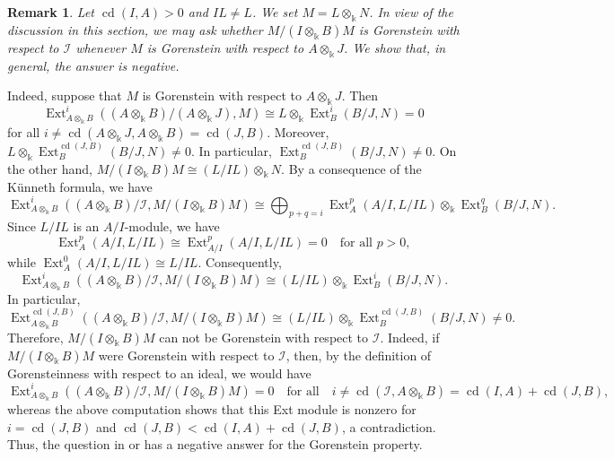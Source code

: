 \documentclass[10pt,a4paper]{amsart}
\numberwithin{equation}{theorem}
\theoremstyle{definition}
\theoremstyle{fact}
\newtheorem{remark}[theorem]{Remark}
\theoremstyle{conjecture}
\newcommand{\cd}{\operatorname{cd}}
\newcommand{\Ext}{\operatorname{Ext}}
\begin{document}
\vspace{.2cm}
\vspace{.3cm}

\begin{remark}{\em
\label{6.10}
Let $\cd(I, A)>0$ and $IL\neq L$.  We set $M=L\otimes_{\Bbbk}N$. In view of the discussion in this section, we may ask whether
$
M/(I\otimes_{\Bbbk}B)M
$
is Gorenstein with respect to $\mathcal{I}$ whenever $M$ is Gorenstein with respect to
$A\otimes_{\Bbbk}J$. We show that, in general, the answer is negative.

Indeed, suppose that $M$ is Gorenstein with respect to
$A\otimes_{\Bbbk}J$. Then
\[
\Ext^i_{A\otimes_{\Bbbk}B}
\left(
(A\otimes_{\Bbbk}B)/(A\otimes_{\Bbbk}J),
M
\right)\cong
L\otimes_{\Bbbk}\Ext^i_B(B/J,N)=0
\]
for all $i\neq\cd(A\otimes_{\Bbbk}J, A\otimes_{\Bbbk}B)=\cd(J,B)$.
Moreover, $L\otimes_{\Bbbk}\Ext^{\cd(J,B)}_B(B/J,N)\neq 0$. In particular, $\Ext^{\cd(J,B)}_B(B/J,N)\neq 0$.
On the other hand, $
M/(I\otimes_{\Bbbk}B)M
\cong (L/IL)\otimes_{\Bbbk}N
$.
By a consequence of the K\"unneth formula, we have
\[
\Ext^i_{A\otimes_{\Bbbk}B}
\left(
(A\otimes_{\Bbbk}B)/\mathcal{I},
M/(I\otimes_{\Bbbk}B)M
\right)
\cong
\bigoplus_{p+q=i}
\Ext^p_A(A/I,L/IL)
\otimes_{\Bbbk}
\Ext^q_B(B/J,N).
\]
Since $L/IL$ is an $A/I$-module, we have
\[
\Ext^p_A(A/I,L/IL)
\cong
\Ext^p_{A/I}(A/I,L/IL)=0
\quad\text{for all }p>0,
\]
while
$
\Ext^0_A(A/I,L/IL)
\cong L/IL.
$
Consequently,
\[
\Ext^i_{A\otimes_{\Bbbk}B}
\left(
(A\otimes_{\Bbbk}B)/\mathcal{I},
M/(I\otimes_{\Bbbk}B)M
\right)
\cong
(L/IL)\otimes_{\Bbbk}
\Ext^i_B(B/J,N).
\]
In particular,
\[
\Ext^{\cd(J, B)}_{A\otimes_{\Bbbk}B}
\left(
(A\otimes_{\Bbbk}B)/\mathcal{I},
M/(I\otimes_{\Bbbk}B)M
\right)
\cong
(L/IL)\otimes_{\Bbbk}
\Ext^{\cd(J, B)}_B(B/J, N)\neq 0.
\]
Therefore, $M/(I\otimes_{\Bbbk}B)M$ can not be Gorenstein with respect to $\mathcal{I}$. Indeed, if
$M/(I\otimes_{\Bbbk}B)M$ were Gorenstein with respect to $\mathcal{I}$,
then, by the definition of Gorensteinness with respect to an ideal, we would have
\[
\Ext^i_{A\otimes_{\Bbbk}B}
\left(
(A\otimes_{\Bbbk}B)/\mathcal{I},
M/(I\otimes_{\Bbbk}B)M
\right)=0
\quad\text{for all}\quad
i\neq
\cd(\mathcal{I},A\otimes_{\Bbbk}B)
=
\cd(I,A)+\cd(J,B),
\]
whereas the above computation shows that this Ext module is nonzero for $i=\cd(J, B)$ and $\cd(J,B)<\cd(I,A)+\cd(J,B)$, a contradiction.
Thus, the question in \cite{R5} or \cite{NR} has a negative answer for the Gorenstein property.}
\end{remark}

\vspace{.2cm}
\vspace{.3cm}
\end{document}
